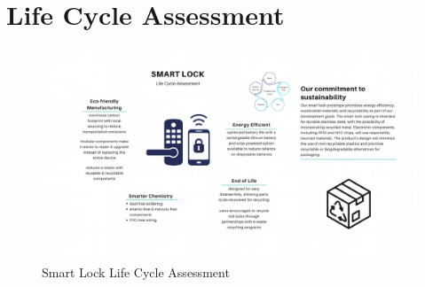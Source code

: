\section{Life Cycle Assessment}


\begin{figure}[htbp]
    \centering
    \includegraphics[width=1 \linewidth]{./img/LifeCycleAssessment.png}
    \caption{Smart Lock Life Cycle Assessment}
    \label{fig:LifeCycleFig}
\end{figure}
